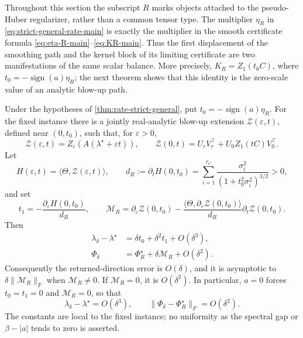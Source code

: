 \begin{remark}
\label{rem:one-scalar-path-center}
Throughout this section the subscript \(R\) marks objects attached to the
pseudo-Huber regularizer, rather than a common tensor type.
The multiplier \(\eta_R\) in \eqref{eq:strict-general-rate-main} is exactly
the multiplier in the smooth certificate formula
\eqref{eq:eta-R-main}--\eqref{eq:KR-main}.  Thus the first displacement of
the smoothing path and the kernel block of its limiting certificate are two
manifestations of the same scalar balance.  More precisely,
\(K_R=Z_1(t_0C)\), where
\(t_0=-\operatorname{sign}(a)\eta_R\); the next theorem shows that this
identity is the zero-scale value of an analytic blow-up path.
\end{remark}

\begin{theorem}
\label{thm:direction-strict-general}
Under the hypotheses of \cref{thm:rate-strict-general}, put
\(t_0=-\operatorname{sign}(a)\eta_R\).  For the fixed instance there is a
jointly real-analytic blow-up extension \(\mathcal Z(\varepsilon,t)\), defined
near \((0,t_0)\), such that, for \(\varepsilon>0\),
\begin{equation}
 \mathcal Z(\varepsilon,t)
 =Z_\varepsilon(A(\lambda^\star+\varepsilon t)),
 \qquad
 \mathcal Z(0,t)=U_rV_r^\top+U_0Z_1(tC)V_0^\top.
 \label{eq:strict-blowup-map-main}
\end{equation}
Let
\[
 H(\varepsilon,t)=\langle\Theta,\mathcal Z(\varepsilon,t)\rangle,
 \qquad
 d_R:=\partial_tH(0,t_0)
 =\sum_{i=1}^{r_C}
 \frac{\sigma_i^2}{(1+t_0^2\sigma_i^2)^{3/2}}>0,
\]
and set
\begin{equation}
 t_1=-\frac{\partial_\varepsilon H(0,t_0)}{d_R},
 \qquad
 \mathcal M_R=\partial_\varepsilon\mathcal Z(0,t_0)
 -\frac{\langle\Theta,\partial_\varepsilon\mathcal Z(0,t_0)\rangle}{d_R}
  \partial_t\mathcal Z(0,t_0).
 \label{eq:strict-direction-constant-main}
\end{equation}
Then
\begin{align}
 \lambda_\delta-\lambda^\star
 &=\delta t_0+\delta^2t_1+O(\delta^3),
 \label{eq:strict-multiplier-second-main}\\
 \Phi_\delta
 &=\Phi_R^\star+\delta\mathcal M_R+O(\delta^2).
 \label{eq:strict-direction-first-main}
\end{align}
Consequently the returned-direction error is \(O(\delta)\), and it is
asymptotic to \(\delta\|\mathcal M_R\|_F\) when
\(\mathcal M_R\ne0\).  If \(\mathcal M_R=0\), it is \(O(\delta^2)\).
In particular, \(a=0\) forces \(t_0=t_1=0\) and
\(\mathcal M_R=0\), so that
\begin{equation}
 \lambda_\delta-\lambda^\star=O(\delta^3),
 \qquad
 \|\Phi_\delta-\Phi_R^\star\|_F=O(\delta^2).
 \label{eq:strict-zero-superconvergence-main}
\end{equation}
The constants are local to the fixed instance; no uniformity as the spectral
gap or \(\beta-|a|\) tends to zero is asserted.
\end{theorem}

